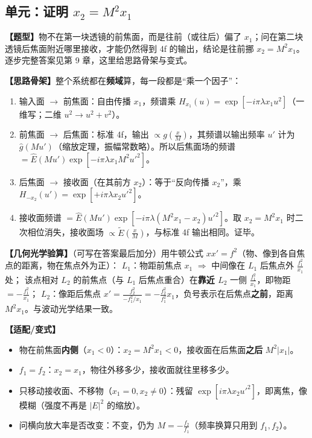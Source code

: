 \subsection*{单元：证明 $x_2=M^2x_1$}

\textbf{【题型】}物不在第一块透镜的前焦面，而是往前（或往后）偏了 $x_1$；问在第二块透镜后焦面附近哪里接收，才能仍然得到 4f 的输出，结论是往前挪 $x_2=M^2x_1$。逐步完整答案见第 9 章\pageref{ex:v-4fshift}，这里给思路骨架与变式。

\textbf{【思路骨架】}整个系统都在\textbf{频域}算，每一段都是“乘一个因子”：
\begin{enumerate}
\item 输入面 $\to$ 前焦面：自由传播 $x_1$，频谱乘 $H_{x_1}(u)=\exp[-i\pi\lambda x_1u^2]$（一维写；二维 $u^2\to u^2+v^2$）。
\item 前焦面 $\to$ 后焦面：标准 4f，输出 $\propto g(\frac xM)$，其频谱以输出频率 $u'$ 计为 $\hat g(Mu')$（缩放定理，振幅常数略）。所以后焦面场的频谱 $=\hat E(Mu')\exp[-i\pi\lambda x_1M^2u'^2]$。
\item 后焦面 $\to$ 接收面（在其前方 $x_2$）：等于“反向传播 $x_2$”，乘 $H_{-x_2}(u')=\exp[+i\pi\lambda x_2u'^2]$。
\item 接收面频谱 $=\hat E(Mu')\exp[-i\pi\lambda(M^2x_1-x_2)u'^2]$。取 $x_2=M^2x_1$ 时二次相位消失，接收面场 $\propto\tilde E(\frac xM)$，与标准 4f 输出相同。证毕。
\end{enumerate}

\textbf{【几何光学验算】}（可写在答案最后加分）用牛顿公式 $xx'=f^2$（物、像到各自焦点的距离，物在焦点外为正）：
$L_1$：物距前焦点 $x_1$ $\Rightarrow$ 中间像在 $L_1$ 后焦点外 $\frac{f_1^2}{x_1}$ 处；
该点相对 $L_2$ 的前焦点（与 $L_1$ 后焦点重合）在\textbf{靠近 $L_2$} 一侧 $\frac{f_1^2}{x_1}$，即物距 $=-\frac{f_1^2}{x_1}$；
$L_2$：像距后焦点 $x'=\frac{f_2^2}{-f_1^2/x_1}=-\frac{f_2^2}{f_1^2}x_1$，负号表示在后焦点\textbf{之前}，距离 $M^2x_1$。与波动光学结果一致。

\textbf{【适配/变式】}
\begin{itemize}
\item 物在前焦面\textbf{内侧}（$x_1<0$）：$x_2=M^2x_1<0$，接收面在后焦面\textbf{之后} $M^2|x_1|$。
\item $f_1=f_2$：$x_2=x_1$，物往外移多少，接收面就往里移多少。
\item 只移动接收面、不移物（$x_1=0,x_2\neq0$）：残留 $\exp[i\pi\lambda x_2u'^2]$，即离焦，像模糊（强度不再是 $|E|^2$ 的缩放）。
\item 问横向放大率是否改变：不变，仍为 $M=-\frac{f_2}{f_1}$（频率换算只用到 $f_1,f_2$）。
\end{itemize}

